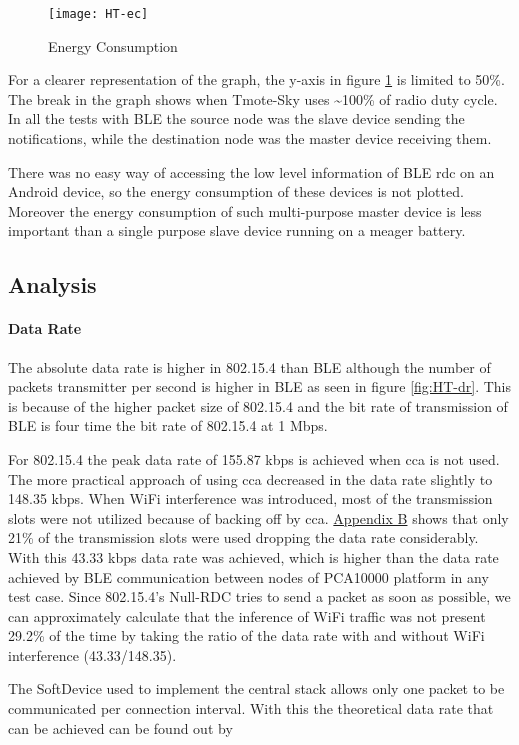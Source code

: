 \begin{figure}[h]
\texttt{[image: HT-ec]}
\caption{Energy Consumption}
\label{fig:HT-ec}
\end{figure}

For a clearer representation of the graph, the y-axis in figure \ref{fig:HT-ec} is limited to 50\%. The break in the graph shows when Tmote-Sky uses \textasciitilde100\% of radio duty cycle. In all the tests with BLE the source node was the slave device sending the notifications, while the destination node was the master device receiving them.

There was no easy way of accessing the low level information of BLE \gls{rdc} on an Android device, so the energy consumption of these devices is not plotted. Moreover the energy consumption of such multi-purpose master device is less important than a single purpose slave device running on a meager battery.

\subsection{Analysis}
\paragraph{Data Rate}
The absolute data rate is higher in 802.15.4 than BLE although the number of packets transmitter per second is higher in BLE as seen in figure \ref{fig:HT-dr}. This is because of the higher packet size of 802.15.4 and the bit rate of transmission of BLE is four time the bit rate of 802.15.4 at 1 Mbps.

For 802.15.4 the peak data rate of 155.87 kbps is achieved when \gls{cca} is not used. The more practical approach of using \gls{cca} decreased in the data rate slightly to 148.35 kbps. When WiFi interference was introduced, most of the transmission slots were not utilized because of backing off by \gls{cca}. \hyperref[AppendixB]{Appendix B} shows that only 21\% of the transmission slots were used dropping the data rate considerably. With this 43.33  kbps data rate was achieved, which is higher than the data rate achieved by BLE communication between nodes of PCA10000 platform in any test case. Since 802.15.4's Null-RDC tries to send a packet as soon as possible, we can approximately calculate that the inference of WiFi traffic was not present 29.2\% of the time by taking the ratio of the data rate with and without WiFi interference (43.33/148.35).

The SoftDevice used to implement the central stack allows only one packet to be communicated per connection interval. With this the theoretical data rate that can be achieved can be found out by 

